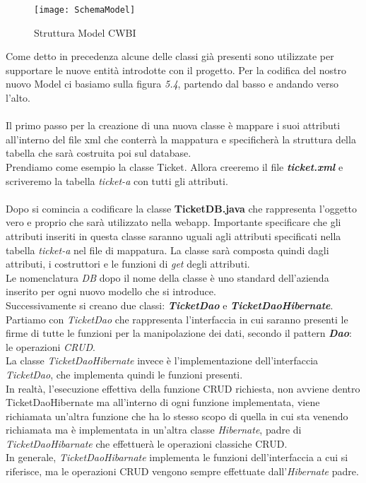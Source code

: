\begin{figure}[H]
    \centering 
    \texttt{[image: SchemaModel]} 
    \bigskip
    \caption{Struttura Model CWBI}
\end{figure}

\noindent
Come detto in precedenza alcune delle classi già presenti sono utilizzate per supportare le nuove entità introdotte con il progetto. Per la codifica del nostro nuovo Model ci basiamo sulla figura \textit{5.4}, partendo dal basso e andando verso l'alto.  \\
\\
\noindent
Il primo passo per la creazione di una nuova classe è mappare i suoi attributi all'interno del file xml che conterrà la mappatura e specificherà la struttura della tabella che sarà costruita poi sul database. \\
Prendiamo come esempio la classe Ticket. Allora creeremo il file \textit{\textbf{ticket.xml}} e scriveremo la tabella \textit{ticket-a} con tutti gli attributi.\\
\\
\noindent
Dopo si comincia a codificare la classe \textbf{TicketDB.java} che rappresenta l'oggetto vero e proprio che sarà utilizzato nella  webapp. Importante specificare che gli attributi inseriti in questa classe saranno uguali agli attributi specificati nella tabella   \textit{ticket-a} nel file di mappatura. La classe sarà composta quindi dagli attributi, i costruttori e le funzioni di \textit{get} degli attributi.\\
Le nomenclatura \textit{DB} dopo il nome della classe è uno standard dell'azienda inserito per ogni nuovo modello che si introduce.
\\
\noindent
Successivamente si creano due classi: \textit{\textbf{TicketDao}} e \textit{\textbf{TicketDaoHibernate}}. \\
Partiamo con \textit{TicketDao} che rappresenta l'interfaccia in cui saranno presenti le firme di tutte le funzioni per la manipolazione dei dati, secondo il pattern \textit{\textbf{Dao}}: le operazioni \textit{CRUD}. \\
La classe \textit{TicketDaoHibernate} invece è l'implementazione dell'interfaccia \textit{TicketDao}, che implementa quindi le funzioni presenti. \\
In realtà, l'esecuzione effettiva della funzione CRUD richiesta, non avviene dentro TicketDaoHibernate ma all'interno di ogni funzione implementata, viene richiamata un'altra funzione che ha lo stesso scopo di quella in cui sta venendo richiamata ma è implementata in un'altra classe \textit{Hibernate}, padre di \textit{TicketDaoHibarnate} che 
effettuerà le operazioni classiche CRUD. \\
In generale, \textit{TicketDaoHibarnate} implementa le funzioni dell'interfaccia a cui si riferisce, ma le operazioni CRUD vengono sempre effettuate dall'\textit{Hibernate} padre.\\

